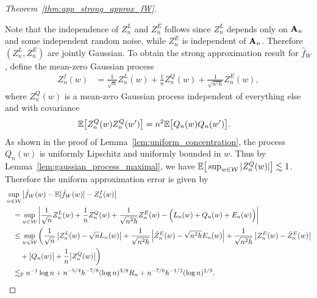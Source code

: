 \begin{proof}[Theorem~\ref{thm:app_strong_approx_fW}]
\begin{enumerate}[label=(\roman*)]
  \end{enumerate}
  Note that the independence of
  $Z_n^L$ and $Z_n^E$
  follows since $Z_n^L$
  depends only on $\mathbf{A}_n$ and some independent random noise,
  while $Z_n^E$ is independent of $\mathbf{A}_n$.
  Therefore $(Z_n^L, Z_n^E)$ are jointly Gaussian.
  To obtain the strong approximation result
  for $\hat f_W$,
  define the mean-zero Gaussian process
  \begin{align*}
    Z_n^f(w)
    &=
    \frac{1}{\sqrt n} Z_n^L(w)
    + \frac{1}{n} Z_n^Q(w)
    + \frac{1}{\sqrt{n^2h}} Z_n^E(w),
  \end{align*}
  where $Z_n^Q(w)$
  is a mean-zero Gaussian process
  independent of everything else and
  with covariance
  \begin{align*}
    \mathbb{E}\big[
      Z_n^Q(w)
      Z_n^Q(w')
      \big]
    &=
    n^2 \mathbb{E}\big[
      Q_n(w)
      Q_n(w')
      \big].
  \end{align*}
  As shown in the proof of
  Lemma~\ref{lem:uniform_concentration},
  the process
  $Q_n(w)$ is uniformly Lipschitz
  and uniformly bounded in $w$.
  Thus by Lemma~\ref{lem:gaussian_process_maximal},
  we have
  $\mathbb{E}\big[\sup_{w \in \mathcal{W}}
    |Z_n^Q(w)|\big]
  \lesssim 1$.
  Therefore the uniform approximation error is given by
  \begin{align*}
    &
    \sup_{w \in \mathcal{W}}
    \big|
    \hat f_W(w) - \mathbb{E}[\hat f_W(w)]
    - Z_n^f(w)
    \big|
    \\
    &\quad=
    \sup_{w \in \mathcal{W}}
    \left|
    \frac{1}{\sqrt n} Z_n^L(w)
    + \frac{1}{n} Z_n^Q(w)
    + \frac{1}{\sqrt{n^2h}} Z_n^E(w)
    - \Big(
    L_n(w) + Q_n(w) + E_n(w)
    \Big)
    \right| \\
    &\quad\leq
    \sup_{w \in \mathcal{W}}
    \bigg(
    \frac{1}{\sqrt n}
    \left|
    Z_n^L(w) - \sqrt{n} L_n(w)
    \right|
    + \frac{1}{\sqrt{n^2h}}
    \left|
    \tilde Z_n^E(w) - \sqrt{n^2h} E_n(w)
    \right|
    + \frac{1}{\sqrt{n^2h}}
    \left|
    Z_n^E(w) - \tilde Z_n^E(w)
    \right| \\
    &\qquad+
    \big| Q_n(w) \big|
    + \frac{1}{n}
    \big| Z_n^Q(w) \big|
    \bigg) \\
    &\quad\lesssim_{\mathbb{P}}
    n^{-1} \log n
    + n^{-5/4} h^{-7/8} (\log n)^{3/8} R_n
    + n^{-7/6} h^{-1/2} (\log n)^{2/3}.
  \end{align*}



\end{proof}
